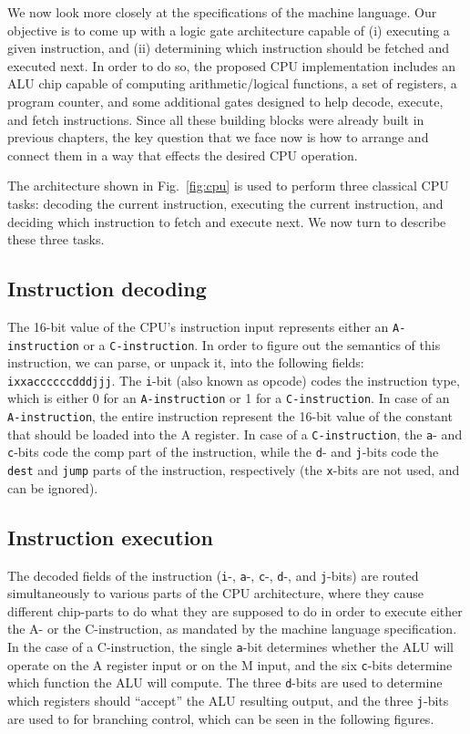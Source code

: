 \documentclass[11pt]{article}
\begin{document}
We now look more closely at the specifications of the machine language. Our objective is to come up with a logic gate architecture capable of (i) executing a given instruction, and (ii) determining which
instruction should be fetched and executed next. In order to do so, the proposed CPU
implementation includes an ALU chip capable of computing arithmetic/logical functions, a set of
registers, a program counter, and some additional gates designed to help decode, execute, and
fetch instructions. Since all these building blocks were already built in previous chapters, the
key question that we face now is how to arrange and connect them in a way that effects the
desired CPU operation. 

The architecture shown in Fig.~\ref{fig:cpu} is used to perform three classical CPU tasks: decoding
the current instruction, executing the current instruction, and deciding which instruction to fetch
and execute next. We now turn to describe these three tasks.

\subsection*{Instruction decoding}
The 16-bit value of the CPU’s instruction input represents either an \texttt{A-instruction} or a \texttt{C-instruction}. In order to figure out the semantics of this instruction, we can parse, or unpack it,
into the following fields: \texttt{ixxaccccccdddjjj}. The \texttt{i}-bit (also known as opcode) codes the
instruction type, which is either 0 for an \texttt{A-instruction} or 1 for a \texttt{C-instruction}. In case of an \texttt{A-instruction}, the entire instruction represent the 16-bit value of the constant that should be loaded
into the A register. In case of a \texttt{C-instruction}, the \texttt{a}- and \texttt{c}-bits code the comp part of the instruction, while the \texttt{d}- and \texttt{j}-bits code the \texttt{dest} and \texttt{jump} parts of the instruction, respectively
(the \texttt{x}-bits are not used, and can be ignored). 

\subsection*{Instruction execution}
The decoded fields of the instruction (\texttt{i}-, \texttt{a}-, \texttt{c}-, \texttt{d}-, and \texttt{j}-bits) are routed simultaneously to various parts of the CPU architecture, where they cause different chip-parts to do what they are supposed to do in order to execute either the A- or the C-instruction, as mandated by the
machine language specification. In the case of a C-instruction, the single \texttt{a}-bit determines
whether the ALU will operate on the A register input or on the M input, and the six \texttt{c}-bits
determine which function the ALU will compute. The three \texttt{d}-bits are used to determine which
registers should “accept” the ALU resulting output, and the three \texttt{j}-bits are used to for branching
control, which can be seen in the following figures.
\end{document}
